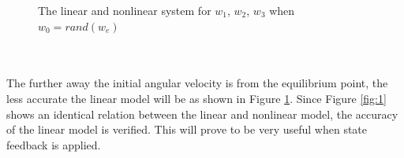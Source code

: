 \documentclass[12pt]{article}
\begin{document}
\begin{figure}[h!]
\centering
{}
\caption{The linear and nonlinear system for $w_{1}$, $w_{2}$, $w_{3}$ when $w_{0} = rand(w_{e})$}
\label{fig:3}
\end{figure}
\\ \\
The further away the initial angular velocity is from the equilibrium point, the less accurate the linear model will be as shown in Figure \ref{fig:3}. Since Figure \ref{fig:1} shows an identical relation between the linear and nonlinear model, the accuracy of the linear model is verified. This will prove to be very useful when state feedback is applied.
\clearpage
\end{document}
